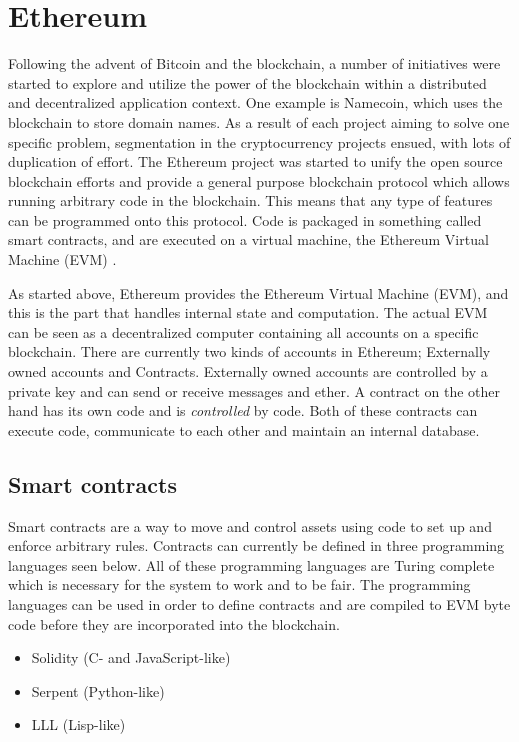 \section{Ethereum}
Following the advent of Bitcoin and the blockchain, a number of initiatives were started to explore and utilize the power of the blockchain within a distributed and decentralized application context. One example is Namecoin, which uses the blockchain to store domain names. As a result of each project aiming to solve one specific problem, segmentation in the cryptocurrency projects ensued, with lots of duplication of effort. The Ethereum project was started to unify the open source blockchain efforts and provide a general purpose blockchain protocol which allows running arbitrary code in the blockchain. This means that any type of features can be programmed onto this protocol. Code is packaged in something called smart contracts, and are executed on a virtual machine, the Ethereum Virtual Machine (EVM) \cite{ethereum:quote}.

As started above, Ethereum provides the Ethereum Virtual Machine (EVM), and this is the part that handles internal state and computation. The actual EVM can be seen as a decentralized computer containing all accounts on a specific blockchain. There are currently two kinds of accounts in Ethereum; Externally owned accounts and Contracts. Externally owned accounts are controlled by a private key and can send or receive messages and ether. A contract on the other hand has its own code and is \emph{controlled} by code. Both of these contracts can execute code, communicate to each other and maintain an internal database. 

\subsection{Smart contracts}
Smart contracts are a way to move and control assets using code to set up and enforce arbitrary rules. Contracts can currently be defined in three programming languages seen below. All of these programming languages are Turing complete which is necessary for the system to work and to be fair. The programming languages can be used in order to define contracts and are compiled to EVM byte code before they are incorporated into the blockchain.

\begin{itemize}
    \item Solidity (C- and JavaScript-like)
    \item Serpent (Python-like)
    \item LLL (Lisp-like)
\end{itemize}

